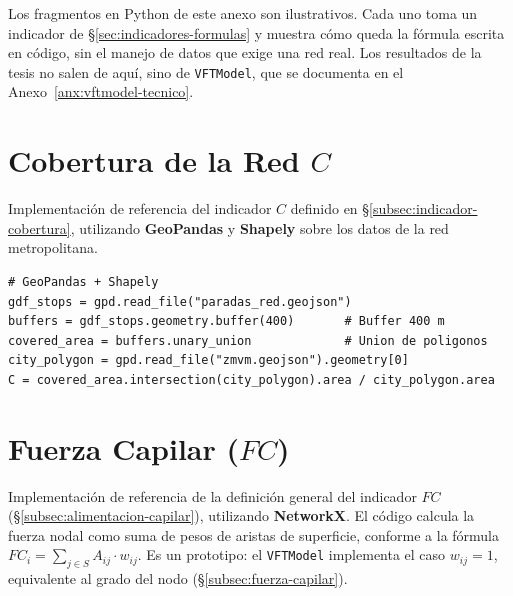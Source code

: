

Los fragmentos en Python de este anexo son ilustrativos. Cada uno toma un
indicador de §\ref{sec:indicadores-formulas} y muestra cómo queda la fórmula
escrita en código, sin el manejo de datos que exige una red real. Los
resultados de la tesis no salen de aquí, sino de \texttt{VFTModel}, que se
documenta en el Anexo~\ref{anx:vftmodel-tecnico}.

\section{Cobertura de la Red \texorpdfstring{$C$}{C}}
\label{anx:impl-cobertura}

Implementación de referencia del indicador $C$ definido en
§\ref{subsec:indicador-cobertura}, utilizando \textbf{GeoPandas} y
\textbf{Shapely} sobre los datos \gtfs{} de la red metropolitana.

\begin{lstlisting}[style=estiloPython,
  caption={Cálculo del indicador $C$ con GeoPandas (prototipo).},
  label={lst:cobertura}]
# GeoPandas + Shapely
gdf_stops = gpd.read_file("paradas_red.geojson")
buffers = gdf_stops.geometry.buffer(400)       # Buffer 400 m
covered_area = buffers.unary_union             # Union de poligonos
city_polygon = gpd.read_file("zmvm.geojson").geometry[0]
C = covered_area.intersection(city_polygon).area / city_polygon.area
\end{lstlisting}

\section{Fuerza Capilar \texorpdfstring{($FC$)}{(FC)}}
\label{anx:impl-capilar}

Implementación de referencia de la definición general del indicador $FC$
(§\ref{subsec:alimentacion-capilar}), utilizando \textbf{NetworkX}. El código
calcula la fuerza nodal como suma de pesos de aristas de superficie, conforme a
la fórmula $FC_i = \sum_{j \in S} A_{ij} \cdot w_{ij}$. Es un prototipo: el
\texttt{VFTModel} implementa el caso $w_{ij} = 1$, equivalente al grado del nodo
(§\ref{subsec:fuerza-capilar}).

